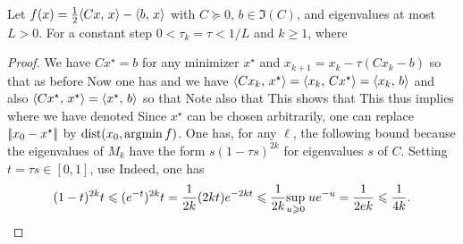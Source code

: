 \begin{prop}\label{prop-graddesc-quad-sublin}
	Let $f(x)=\frac12\langle Cx,\,x\rangle-\langle b,\,x\rangle$ with $C\succeq0$, $b\in\Im(C)$, and eigenvalues at most $L>0$. For a constant step $0<\tau_k=\tau<1/L$ and $k\geq1$,
	where 
\end{prop}
\begin{proof}	
	We have $C x^\star=b$ for any minimizer $x^\star$
	and $x_{k+1}=x_k-\tau (C x_k-b)$ so that as before
	Now one has
	and we have $\langle Cx_k,\,x^\star\rangle = \langle x_k,\,Cx^\star\rangle = \langle x_k,\,b\rangle$
	and also $\langle Cx^\star,\,x^\star\rangle = \langle x^\star,\,b\rangle$ so that
	Note also that 
	This shows that 
	This thus implies 
	where we have denoted
	Since $x^\star$ can be chosen arbitrarily, one can replace $|\!| x_0-x^\star |\!|$ by $\text{\upshape dist}(x_0,\operatorname{argmin} f)$.
	One has, for any $\ell$, the following bound 
	because the eigenvalues of $M_k$ have the form $s(1-\tau s)^{2k}$ for eigenvalues $s$ of $C$. Setting $t=\tau s\in[0,1]$, use
	Indeed, one has
	\begin{align*}
		(1-t)^{2k} t \leqslant (e^{-t})^{2k}t
		= \frac{1}{2k} (2kt) e^{-2k t}
		\leqslant \frac{1}{2k} \underset{u \geqslant 0}{\sup}\; u e^{-u}
		= \frac{1}{2e k} \leqslant \frac{1}{4k}.
	\end{align*}
\end{proof}	
	



